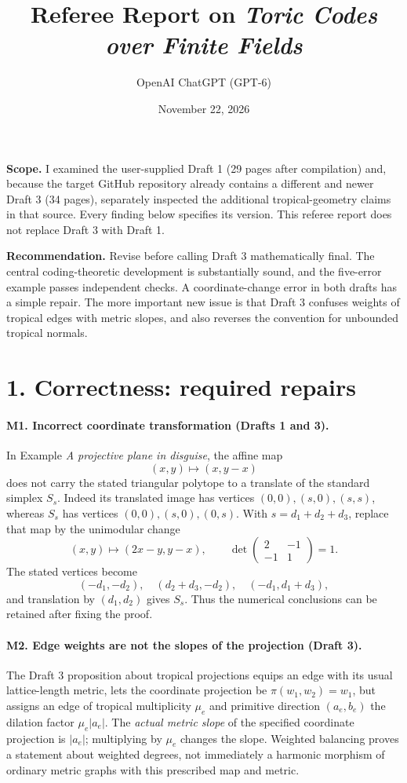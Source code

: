 \documentclass[12pt,letterpaper]{article}
\title{Referee Report on \emph{Toric Codes over Finite Fields}}
\author{OpenAI ChatGPT (GPT-6)}
\date{November 22, 2026}
\begin{document}
\maketitle

\noindent\textbf{Scope.} I examined the user-supplied Draft 1 (29 pages after compilation) and, because the target GitHub repository already contains a different and newer Draft 3 (34 pages), separately inspected the additional tropical-geometry claims in that source. Every finding below specifies its version. This referee report does not replace Draft 3 with Draft 1.

\medskip
\noindent\textbf{Recommendation.} Revise before calling Draft 3 mathematically final. The central coding-theoretic development is substantially sound, and the five-error example passes independent checks. A coordinate-change error in both drafts has a simple repair. The more important new issue is that Draft 3 confuses weights of tropical edges with metric slopes, and also reverses the convention for unbounded tropical normals.

\section*{1. Correctness: required repairs}

\paragraph{M1. Incorrect coordinate transformation (Drafts 1 and 3).}
In Example \emph{A projective plane in disguise}, the affine map
\[
  (x,y)\longmapsto(x,y-x)
\]
does not carry the stated triangular polytope to a translate of the standard simplex \(S_s\). Indeed its translated image has vertices
\((0,0),(s,0),(s,s)\), whereas \(S_s\) has vertices
\((0,0),(s,0),(0,s)\). With \(s=d_1+d_2+d_3\), replace that map by the unimodular change
\[
   (x,y)\longmapsto (2x-y,y-x),\qquad
   \det\begin{pmatrix}2&-1\\-1&1\end{pmatrix}=1 .
\]
The stated vertices become
\[
(-d_1,-d_2),\quad (d_2+d_3,-d_2),\quad (-d_1,d_1+d_3),
\]
and translation by \((d_1,d_2)\) gives \(S_s\). Thus the numerical conclusions can be retained after fixing the proof.

\paragraph{M2. Edge weights are not the slopes of the projection (Draft 3).}
The Draft 3 proposition about tropical projections equips an edge with its usual lattice-length metric, lets the coordinate projection be
\(\pi(w_1,w_2)=w_1\), but assigns an edge of tropical multiplicity \(\mu_e\) and primitive direction \((a_e,b_e)\) the dilation factor
\(\mu_e|a_e|\). The \emph{actual metric slope} of the specified coordinate projection is \(|a_e|\); multiplying by \(\mu_e\) changes the slope. Weighted balancing proves a statement about weighted degrees, not immediately a harmonic morphism of ordinary metric graphs with this prescribed map and metric.
\end{document}
